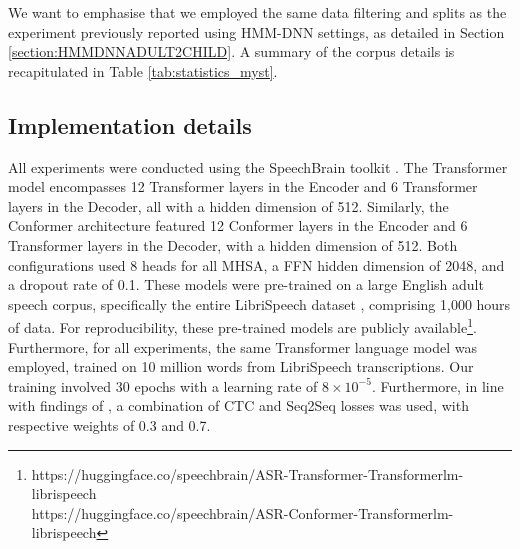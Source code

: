 We want to emphasise that we employed the same data filtering and splits as the experiment previously reported using \ac{HMM-DNN} settings, as detailed in Section \ref{section:HMMDNNADULT2CHILD}. A summary of the corpus details is recapitulated in Table \ref{tab:statistics_myst}.

\subsection{Implementation details}
\label{section:TransformerConformerDetails}
All experiments were conducted using the SpeechBrain toolkit \cite{speechbrain}. The Transformer model encompasses 12 Transformer layers in the Encoder and 6 Transformer layers in the Decoder, all with a hidden dimension of 512. Similarly, the Conformer architecture featured 12 Conformer layers in the Encoder and 6 Transformer layers in the Decoder, with a hidden dimension of 512. Both configurations used 8 heads for all \ac{MHSA}, a \ac{FFN} hidden dimension of 2048, and a dropout rate of 0.1. These models were pre-trained on a large English adult speech corpus, specifically the entire LibriSpeech dataset \cite{librispeech}, comprising 1,000 hours of data. For reproducibility, these pre-trained models are publicly available\footnote{https://huggingface.co/speechbrain/ASR-Transformer-Transformerlm-librispeech\\ https://huggingface.co/speechbrain/ASR-Conformer-Transformerlm-librispeech}. Furthermore, for all experiments, the same Transformer language model was employed, trained on 10 million words from LibriSpeech transcriptions. Our training involved 30 epochs with a learning rate of $8 \times 10^{-5}$. Furthermore, in line with findings of \cite{gelin2021endtoend}, a combination of \ac{CTC} and \ac{Seq2Seq} losses was used, with respective weights of 0.3 and 0.7.

